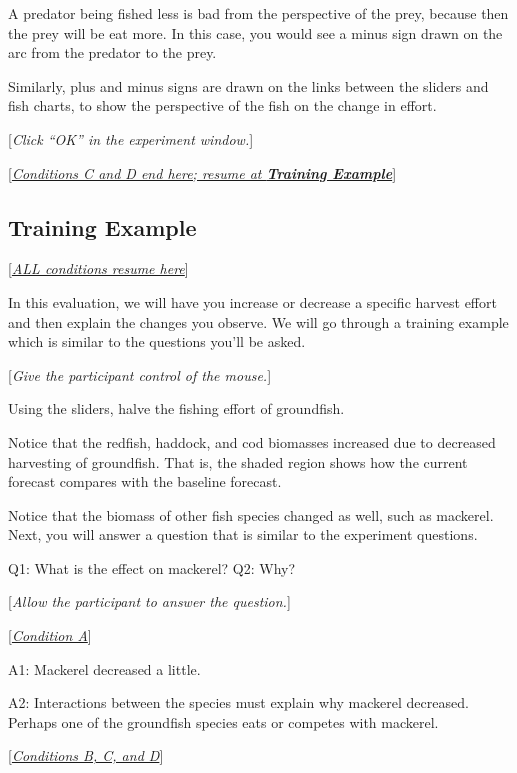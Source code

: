 {{{{\begin{minipage}{\textwidth}
{A predator being fished less is bad from the perspective of the prey, because then the prey will be eat more.  In this case, you would see a minus sign drawn on the arc from the predator to the prey.

Similarly, plus and minus signs are drawn on the links between the sliders and fish charts, to show the perspective of the fish on the change in effort.


[\textit{Click ``OK'' in the experiment window.}]

[\underline{\textit{Conditions C and D end here; resume at \textbf{Training Example}}}]
}
\end{minipage}
}

\subsection{Training Example}

[\underline{\textit{ALL conditions resume here}}]

In this evaluation, we will have you increase or decrease a specific harvest effort and then explain the changes you observe.  We will go through a training example which is similar to the questions you'll be asked.

[\textit{Give the participant control of the mouse.}]

Using the sliders, halve the fishing effort of groundfish.

Notice that the redfish, haddock, and cod biomasses increased due to decreased harvesting of groundfish.  That is, the shaded region shows how the current forecast compares with the baseline forecast.

Notice that the biomass of other fish species changed as well, such as mackerel. Next, you will answer a question that is similar to the experiment questions.

Q1: What is the effect on mackerel?  Q2: Why?

[\textit{Allow the participant to answer the question.}]

\begin{minipage}[t]{0.45\textwidth}
{\setlength{\parskip}{1em}
[\underline{\textit{Condition A}}]

A1: Mackerel decreased a little.

A2: Interactions between the species must explain why mackerel decreased.  Perhaps one of the groundfish species eats or competes with mackerel.
} \end{minipage} \qquad
\begin{minipage}[t]{0.45\textwidth}
{\setlength{\parskip}{1em}
[\underline{\textit{Conditions B, C, and D}}]

}
\end{minipage}}}}
